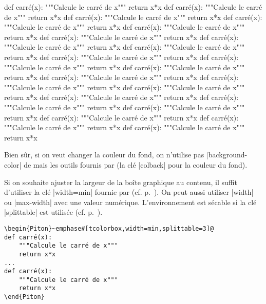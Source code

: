 \documentclass[dvipsnames,svgnames]{article}
\begin{document}
\begin{Piton}[tcolorbox,splittable=3]
def carré(x):
    """Calcule le carré de x"""
    return x*x
def carré(x):
    """Calcule le carré de x"""
    return x*x
def carré(x):
    """Calcule le carré de x"""
    return x*x
def carré(x):
    """Calcule le carré de x"""
    return x*x
def carré(x):
    """Calcule le carré de x"""
    return x*x
def carré(x):
    """Calcule le carré de x"""
    return x*x
def carré(x):
    """Calcule le carré de x"""
    return x*x
def carré(x):
    """Calcule le carré de x"""
    return x*x
def carré(x):
    """Calcule le carré de x"""
    return x*x
def carré(x):
    """Calcule le carré de x"""
    return x*x
def carré(x):
    """Calcule le carré de x"""
    return x*x
def carré(x):
    """Calcule le carré de x"""
    return x*x
def carré(x):
    """Calcule le carré de x"""
    return x*x
def carré(x):
    """Calcule le carré de x"""
    return x*x
def carré(x):
    """Calcule le carré de x"""
    return x*x
def carré(x):
    """Calcule le carré de x"""
    return x*x
def carré(x):
    """Calcule le carré de x"""
    return x*x
def carré(x):
    """Calcule le carré de x"""
    return x*x
def carré(x):
    """Calcule le carré de x"""
    return x*x
def carré(x):
    """Calcule le carré de x"""
    return x*x
\end{Piton}


Bien sûr, si on veut changer la couleur du fond, on n'utilise pas
|background-color| de  mais les outils fournis par 
(la clé |colback| pour la couleur du fond).


\bigskip
Si on souhaite ajuster la largeur de la boîte graphique au contenu, il suffit
d'utiliser la clé |width=min| fournie par  (cf. p.~\pageref{width}).
On peut aussi utiliser |width| ou |max-width| avec une valeur numérique.
L'environnement est sécable si la clé |splittable| est utilisée
(cf. p.~\pageref{coupure-de-pages}).

\begin{Verbatim}
\begin{Piton}~emphase#[tcolorbox,width=min,splittable=3]@
def carré(x):
    """Calcule le carré de x"""
    return x*x
...
def carré(x):
    """Calcule le carré de x"""
    return x*x
\end{Piton}
\end{Verbatim}
\end{document}
